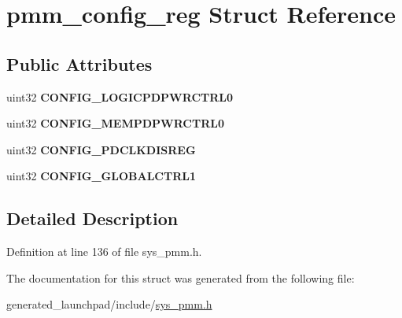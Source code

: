 \hypertarget{structpmm__config__reg}{}\section{pmm\+\_\+config\+\_\+reg Struct Reference}
\label{structpmm__config__reg}
\subsection*{Public Attributes}
\begin{DoxyCompactItemize}
\item 
\mbox{\label{structpmm__config__reg_a4c46e0fca70c7b5aa37ae4ce0ac203d0}} 
uint32 {\bfseries C\+O\+N\+F\+I\+G\+\_\+\+L\+O\+G\+I\+C\+P\+D\+P\+W\+R\+C\+T\+R\+L0}
\item 
\mbox{\label{structpmm__config__reg_a540b84a7543a58f707cf54228fc26b65}} 
uint32 {\bfseries C\+O\+N\+F\+I\+G\+\_\+\+M\+E\+M\+P\+D\+P\+W\+R\+C\+T\+R\+L0}
\item 
\mbox{\label{structpmm__config__reg_aff44eed9740974194f66e217d33469e9}} 
uint32 {\bfseries C\+O\+N\+F\+I\+G\+\_\+\+P\+D\+C\+L\+K\+D\+I\+S\+R\+EG}
\item 
\mbox{\label{structpmm__config__reg_a18be71ec0cbc14bee83f8edf6395898d}} 
uint32 {\bfseries C\+O\+N\+F\+I\+G\+\_\+\+G\+L\+O\+B\+A\+L\+C\+T\+R\+L1}
\end{DoxyCompactItemize}


\subsection{Detailed Description}


Definition at line 136 of file sys\+\_\+pmm.\+h.



The documentation for this struct was generated from the following file\+:\begin{DoxyCompactItemize}
\item 
generated\+\_\+launchpad/include/\mbox{\hyperlink{sys__pmm_8h}{sys\+\_\+pmm.\+h}}\end{DoxyCompactItemize}
